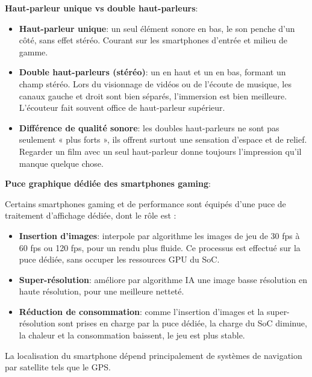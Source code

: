 
\textbf{Haut-parleur unique vs double haut-parleurs}:

\begin{itemize}
  \item \textbf{Haut-parleur unique}: un seul élément sonore en bas, le son penche d'un côté, sans effet stéréo. Courant sur les smartphones d'entrée et milieu de gamme.
  \item \textbf{Double haut-parleurs (stéréo)}: un en haut et un en bas, formant un champ stéréo. Lors du visionnage de vidéos ou de l'écoute de musique, les canaux gauche et droit sont bien séparés, l'immersion est bien meilleure. L'écouteur fait souvent office de haut-parleur supérieur.
  \item \textbf{Différence de qualité sonore}: les doubles haut-parleurs ne sont pas seulement « plus forts », ils offrent surtout une sensation d'espace et de relief. Regarder un film avec un seul haut-parleur donne toujours l'impression qu'il manque quelque chose.
\end{itemize}

\textbf{Puce graphique dédiée des smartphones gaming}:

Certains smartphones gaming et de performance sont équipés d'une puce de traitement d'affichage dédiée, dont le rôle est :

\begin{itemize}
  \item \textbf{Insertion d'images}: interpole par algorithme les images de jeu de 30 fps à 60 fps ou 120 fps, pour un rendu plus fluide. Ce processus est effectué sur la puce dédiée, sans occuper les ressources GPU du SoC.
  \item \textbf{Super-résolution}: améliore par algorithme IA une image basse résolution en haute résolution, pour une meilleure netteté.
  \item \textbf{Réduction de consommation}: comme l'insertion d'images et la super-résolution sont prises en charge par la puce dédiée, la charge du SoC diminue, la chaleur et la consommation baissent, le jeu est plus stable.
\end{itemize}


La localisation du smartphone dépend principalement de systèmes de navigation par satellite tels que le GPS.

